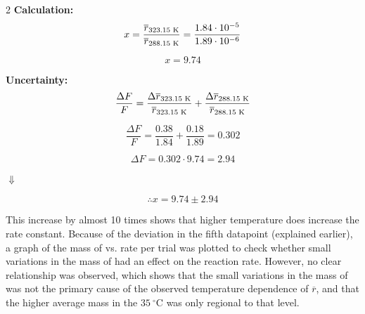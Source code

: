 \documentclass[hyphens]{article}
\begin{document}
\begin{multicols}{2}
  \noindent \textbf{Calculation:}
  \begin{equation*}
    x = \frac{\overline{r}_\text{323.15\ \text{K}}}{\overline{r}_\text{288.15\ \text{K}}} = \frac{1.84 \cdot 10^{-5}}{1.89 \cdot 10^{-6}}
  \end{equation*}

  \vspace{-\baselineskip}
  \begin{equation*}
    x = 9.74
  \end{equation*}

  \columnbreak

  \noindent \textbf{Uncertainty:}
  \begin{equation*}
    \frac{\Delta{F}}{F} = \frac{\Delta{\overline{r}_\text{323.15\ \text{K}}}}{\overline{r}_\text{323.15\ \text{K}}} + \frac{\Delta{\overline{r}_\text{288.15\ \text{K}}}}{\overline{r}_\text{288.15\ \text{K}}}
  \end{equation*}

  \vspace{-\baselineskip}
  \begin{equation*}
    \frac{\Delta{F}}{F} = \frac{0.38}{1.84} + \frac{0.18}{1.89} = 0.302
  \end{equation*}

  \vspace{-\baselineskip}
  \begin{equation*}
    \Delta{F} = 0.302 \cdot 9.74 = 2.94
  \end{equation*}
\end{multicols}

\begin{center}
  $\Downarrow$
\end{center}

\vspace{-\baselineskip}
\begin{equation}
  \therefore x = 9.74 \pm 2.94
\end{equation}

This increase by almost 10 times shows that higher temperature does increase the rate constant. Because of the deviation in the fifth datapoint (explained earlier), a graph of the mass of  vs. rate per trial was plotted to check whether small variations in the mass of  had an effect on the reaction rate. However, no clear relationship was observed, which shows that the small variations in the mass of  was not the primary cause of the observed temperature dependence of $\overline{r}$, and that the higher average  mass in the $35\ ^\circ \text{C}$ was only regional to that level.
\end{document}
